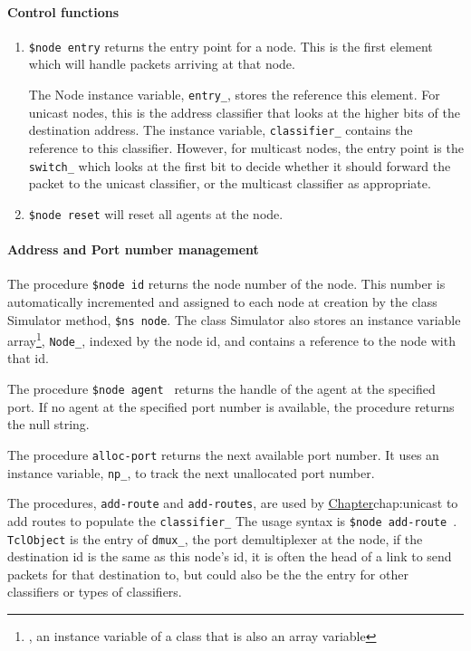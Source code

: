 \paragraph{Control functions}
\begin{enumerate}
\item {\tt \$node entry} %
returns the entry point for a node.
This is the first element which will handle packets arriving at that node.

The Node instance variable, {\tt entry\_}, stores the reference this element.
For unicast nodes, this is the address classifier that looks at the higher
bits of the destination address.
The instance variable, {\tt classifier\_} contains the reference to this
classifier.
However, for multicast nodes, the entry point is the
{\tt switch\_} which looks at the first bit to decide whether
it should forward the packet to the unicast classifier, or the multicast
classifier as appropriate.

\item {\tt \$node reset} %
will reset all agents at the node.
\end{enumerate}


\paragraph{Address and Port number management}
The procedure {\tt \$node id} %
returns the node number of the node.
This number is automatically incremented and assigned to each node at
creation by the class Simulator method, {\tt \$ns node}.%
The class Simulator also stores an instance variable array\footnote{%
  \ie, an instance variable of a class that is also an array variable},
  {\tt Node\_}, indexed by the node id, and contains a reference to the
  node with that id.

The procedure {\tt \$node agent } %
returns the handle of the
agent at the specified port.
If no agent at the specified port number is available, the procedure returns
the null string.

The procedure {\tt alloc-port} returns the next available port number.
It uses an instance variable, {\tt np\_},
to track the next unallocated port number.

The procedures, {\tt add-route} and {\tt add-routes},
are used by \href{unicast routing}{Chapter}{chap:unicast}
to add routes to populate the {\tt classifier\_}
The usage syntax is
{\tt \$node add-route  }. %
{\tt TclObject} is the entry of {\tt dmux\_}, the port demultiplexer
at the node, if the destination id is the same as this node's id,
it is often the head of a link to send packets for that destination to,
but could also be the the entry for other classifiers or types of classifiers.

